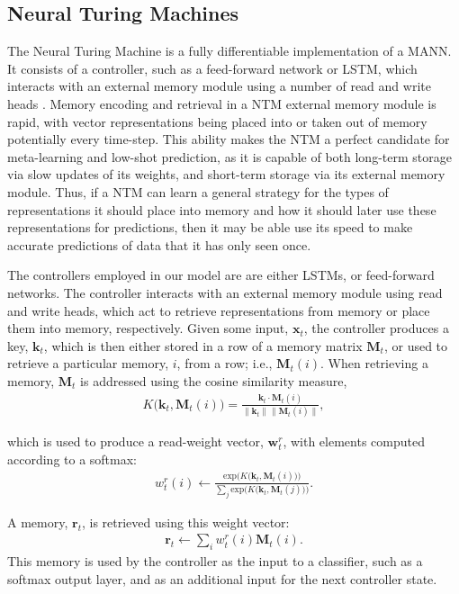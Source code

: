 \documentclass{article}
\begin{document}
\subsection{Neural Turing Machines}
The Neural Turing Machine is a fully differentiable implementation of a MANN. It consists of a controller, such as a feed-forward network or LSTM, which interacts with an external memory module using a number of read and write heads \cite{graves2014neural}. Memory encoding and retrieval in a NTM external memory module is rapid, with vector representations being placed into or taken out of memory potentially every time-step. This ability makes the NTM a perfect candidate for meta-learning and low-shot prediction, as it is capable of both long-term storage via slow updates of its weights, and short-term storage via its external memory module. Thus, if a NTM can learn a general strategy for the types of representations it should place into memory and how it should later use these representations for predictions, then it may be able use its speed to make accurate predictions of data that it has only seen once. 

The controllers employed in our model are are either LSTMs, or feed-forward networks. The controller interacts with an external memory module using read and write heads, which act to retrieve representations from memory or place them into memory, respectively. Given some input, $\mathbf{x}_t$, the controller produces a key, $\mathbf{k}_t$, which is then either stored in a row of a memory matrix $\mathbf{M}_t$, or used to retrieve a particular memory, $i$, from a row; i.e., $\mathbf{M}_t(i)$. When retrieving a memory, $\mathbf{M}_t$ is addressed using the cosine similarity measure,
\begin{align}
    K\big(\mathbf{k}_t, \mathbf{M}_{t}(i)\big) = \frac{\mathbf{k}_t \cdot \mathbf{M}_{t}(i)}{\parallel\mathbf{k}_t\parallel\parallel\mathbf{M}_{t}(i)\parallel},
\end{align}

which is used to produce a read-weight vector, $\mathbf{w}_t^r$, with elements computed according to a softmax:
\begin{align}
    w_t^{r}(i) \leftarrow \frac{\text{exp}\big(K\big(\mathbf{k}_t, \mathbf{M}_{t}(i)\big)\big)}{\sum_j \text{exp} \big( K\big(\mathbf{k}_t, \mathbf{M}_{t}(j)\big)\big)}.
\end{align}

A memory, $\mathbf{r}_t$, is retrieved using this weight vector:
\begin{align}
    \mathbf{r}_t \leftarrow \sum_i {w}_t^r(i)\mathbf{M}_{t}(i).
\end{align}
This memory is used by the controller as the input to a classifier, such as a softmax output layer, and as an additional input for the next controller state.
\end{document}
